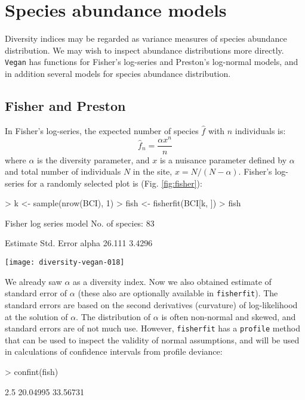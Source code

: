 \documentclass[a4paper,10pt]{amsart}
\begin{document}
\section{Species abundance models}

Diversity indices may be regarded as variance measures of species
abundance distribution.  We may wish to inspect abundance
distributions more directly.  \texttt{Vegan} has functions for
Fisher's log-series and Preston's log-normal models, and in addition
several models for species abundance distribution.

\subsection{Fisher and Preston}

In Fisher's log-series, the expected number of species $\hat f$ with $n$
individuals is:
\begin{equation}
\hat f_n = \frac{\alpha x^n}{n}
\end{equation}
where $\alpha$ is the diversity parameter, and $x$ is a nuisance
parameter defined by $\alpha$ and total number
of individuals $N$ in the site, $x = N/(N-\alpha)$.  Fisher's
log-series for a randomly selected plot is (Fig. \ref{fig:fisher}):
\begin{Schunk}
\begin{Sinput}
> k <- sample(nrow(BCI), 1)
> fish <- fisherfit(BCI[k, ])
> fish
\end{Sinput}
\begin{Soutput}
Fisher log series model
No. of species: 83 

      Estimate Std. Error
alpha   26.111     3.4296
\end{Soutput}
\end{Schunk}
\begin{SCfigure}
\texttt{[image: diversity-vegan-018]}
\caption{Fisher's log-series fitted to one randomly selected site
  (35).}
\label{fig:fisher}
\end{SCfigure}
We already saw $\alpha$ as a diversity index.  Now we also obtained
estimate of standard error of $\alpha$ (these also are optionally
available in \texttt{fisherfit}).  The standard errors are based on
the second derivatives (curvature) of log-likelihood at the solution
of $\alpha$.  The distribution of $\alpha$ is often non-normal
and skewed, and standard errors are of not much use.  However,
\texttt{fisherfit} has a \texttt{profile} method that can be used to
inspect the validity of normal assumptions, and will be used in
calculations of confidence intervals from profile deviance:
\begin{Schunk}
\begin{Sinput}
> confint(fish)
\end{Sinput}
\begin{Soutput}
   2.5 %   97.5 % 
20.04995 33.56731 
\end{Soutput}
\end{Schunk}
\end{document}
